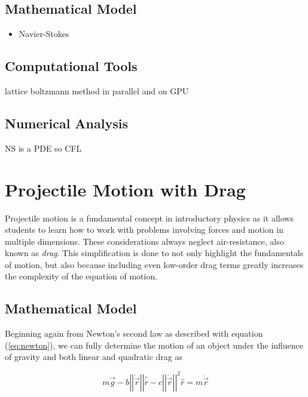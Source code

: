 \documentclass{report}
\begin{document}
        \subsection{Mathematical Model}

            \begin{itemize}
                \item Navier-Stokes
            \end{itemize}

        \subsection{Computational Tools}

            lattice boltzmann method in parallel and on GPU

        \subsection{Numerical Analysis}

            NS is a PDE so CFL

\pagebreak

    \section{Projectile Motion with Drag}

        Projectile motion is a fundamental concept in introductory physics as it allows students to learn how to work with problems involving forces and motion in multiple dimensions.  These considerations always neglect air-resistance, also known as \emph{drag}.  This simplification is done to not only highlight the fundamentals of motion, but also because including even low-order drag terms greatly increases the complexity of the equation of motion.

        \subsection{Mathematical Model}

            Beginning again from Newton's second law as described with equation (\ref{eq:newton}), we can fully determine the motion of an object under the influence of gravity and both linear and quadratic drag as\cite{taylor2005classical}

            \begin{equation}
                m \vec{g} - b \left|\left| \dot{\vec{r}} \right|\right| \hat{\dot{r}} - c \left|\left|\dot{\vec{r}}\right|\right|^2 \hat{r} = m \ddot{\vec{r}}
            \end{equation}
\end{document}

